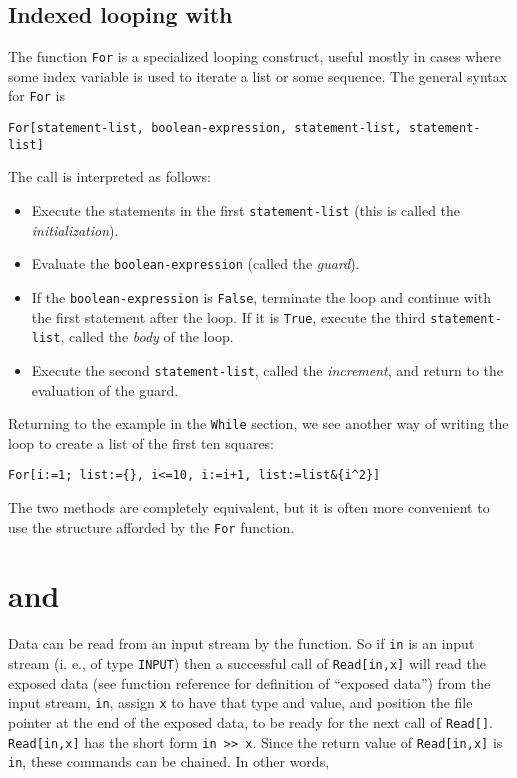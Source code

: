\subsection{Indexed looping with }

The function \verb+For+ is a specialized looping construct, useful
mostly in cases where some index variable is used to iterate a list or
some sequence.  The general syntax for \verb+For+ is

\begin{verbatim}
For[statement-list, boolean-expression, statement-list, statement-list]
\end{verbatim}

\noindent The call is interpreted as follows:
\begin{itemize}
\item Execute the statements in the first \verb+statement-list+ (this
is called the {\em initialization}).
\item Evaluate the \verb+boolean-expression+ (called the {\em guard}).
\item If the \verb+boolean-expression+ is \verb+False+, terminate the
loop and continue with the first statement after the loop.  If it is
\verb+True+, execute the third \verb+statement-list+, called the {\em
body} of the loop.
\item Execute the second \verb+statement-list+, called the {\em
increment}, and return to the evaluation of the guard.
\end{itemize}

Returning to the example in the \verb+While+ section, we see another
way of writing the loop to create a list of the first ten squares:

\begin{verbatim}
For[i:=1; list:={}, i<=10, i:=i+1, list:=list&{i^2}]
\end{verbatim}

\noindent The two methods are completely equivalent, but it is often
more convenient to use the structure afforded by the \verb+For+
function.

\section{ and }

Data can be read from an input stream by the  function.
So if \verb+in+ is an input stream (i. e., of type \verb+INPUT+) then
a successful call of \verb+Read[in,x]+ will read the exposed data (see
function reference for definition of ``exposed data'') from the input
stream, \verb+in+, assign \verb+x+ to have that type and value, and
position the file pointer at the end of the exposed data, to be ready
for the next call of \verb+Read[]+.  \verb+Read[in,x]+ has the short
form \verb+in >> x+.  Since the return value of \verb+Read[in,x]+ is
\verb+in+, these commands can be chained.  In other words,


